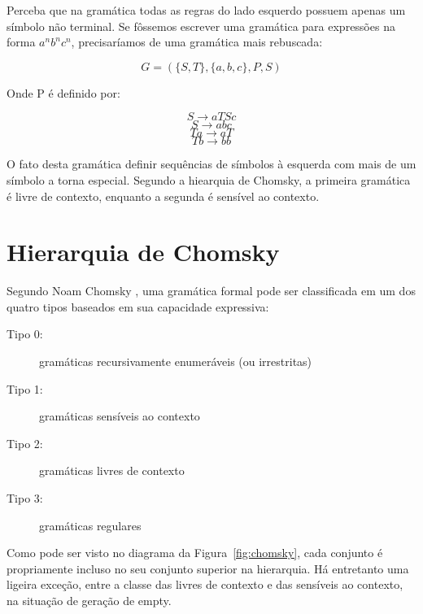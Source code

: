 \documentclass[a4paper,12pt,oneside,onecolumn]{uerj}
\begin{document}
Perceba que na gramática todas as regras do lado esquerdo possuem apenas um símbolo não terminal. Se fôssemos escrever uma gramática para expressões na forma $a^nb^nc^n$, precisaríamos de uma gramática mais rebuscada:

\begin{equation*}
	G = (\{S, T\}, \{a,b,c\}, P, S)
\end{equation*}

Onde P é definido por:

\begin{equation*}
	S \rightarrow aTSc
\end{equation*}
\begin{equation*}
	S \rightarrow abc
\end{equation*}
\begin{equation*}
	Ta \rightarrow aT
\end{equation*}
\begin{equation*}
	Tb \rightarrow bb
\end{equation*}

O fato desta gramática definir sequências de símbolos à esquerda com mais de um símbolo a torna especial. Segundo a hiearquia de Chomsky, a primeira gramática é livre de contexto, enquanto a segunda é sensível ao contexto.

\section{Hierarquia de Chomsky}

Segundo Noam Chomsky \cite{bib:Chomsky57}, uma gramática formal pode ser classificada em um dos quatro tipos baseados em sua capacidade expressiva:

\begin{description}
    \item[Tipo 0:] gramáticas recursivamente enumeráveis (ou irrestritas)
    \item[Tipo 1:] gramáticas sensíveis ao contexto
    \item[Tipo 2:] gramáticas livres de contexto
    \item[Tipo 3:] gramáticas regulares
\end{description}

Como pode ser visto no diagrama da Figura~\ref{fig:chomsky}, cada conjunto é propriamente incluso no seu conjunto superior na hierarquia. Há entretanto uma ligeira exceção, entre a classe das livres de contexto e das sensíveis ao contexto, na situação de geração de empty.
\end{document}
